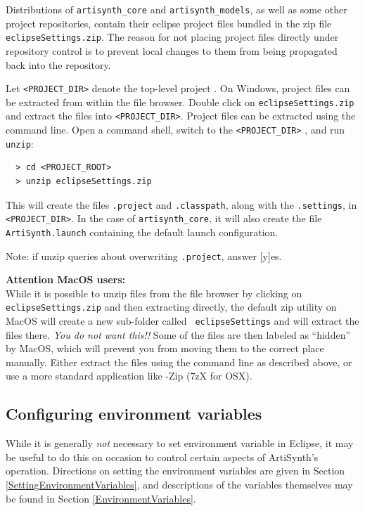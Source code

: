 Distributions of {\tt artisynth\_core} and {\tt artisynth\_models}, as
well as some other project repositories, contain their eclipse project
files bundled in the zip file {\tt eclipseSettings.zip}.  The reason
for not placing project files directly under repository control is to
prevent local changes to them from being propagated back into the
repository.

Let {\tt <PROJECT\_DIR>} denote the top-level project \directory{}.
%
\ifWindows
On Windows, project files can be extracted from within the 
file browser. Double click on {\tt eclipseSettings.zip}
and extract the files into {\tt <PROJECT\_DIR>}.
\else
Project files can be extracted using the command line.
Open a command shell, 
switch to the {\tt <PROJECT\_DIR>} \directory{}, and run {\tt unzip}:
\begin{verbatim}
  > cd <PROJECT_ROOT>
  > unzip eclipseSettings.zip
\end{verbatim}
\fi
This will create the files {\tt .project} and {\tt .classpath}, along
with the \directory{} {\tt .settings}, in {\tt <PROJECT\_DIR>}.  In
the case of {\tt artisynth\_core}, it will also create the file {\tt
ArtiSynth.launch} containing the default launch configuration.

\begin{sideblock}
Note: if unzip queries about overwriting {\tt .project}, answer [y]es.
\end{sideblock}

\ifMacOS
\begin{sideblock}
{\bf Attention MacOS users:}\\[0.5em]
While it is possible to unzip files from the file browser by clicking
on {\tt eclipseSettings.zip} and then extracting directly, the default
zip utility on MacOS will create a new sub-folder called {\tt
eclipseSettings} and will extract the files there.
\emph{You do not want this!!}
Some of the files are then labeled as ``hidden'' by MacOS, which will
prevent you from moving them to the correct place manually. 
Either extract the files using the command line as described
above, or use a more standard application like {-Zip} ({\sf 7zX} for OSX).
\end{sideblock}
\fi

\subsection{Configuring environment variables}
\label{EclipseEnvironmentVariables}

While it is generally {\it not} necessary to set environment variable
in Eclipse, it may be useful to do this on occasion to control certain
aspects of ArtiSynth's operation.  Directions on setting the
environment variables are given in
Section \ref{SettingEnvironmentVariables}, and descriptions of the
variables themselves may be found in
Section \ref{EnvironmentVariables}.

